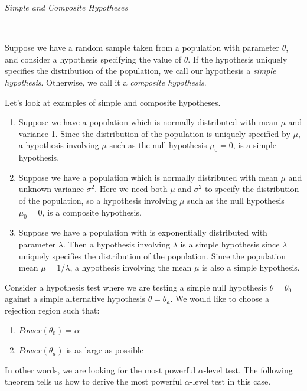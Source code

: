 \documentclass[notes.tex]{subfiles}
\begin{document}
\begin{framed}
\emph{Simple and Composite Hypotheses}\\
  \rule{\dimexpr{}\fboxrule}{.1pt} \\
Suppose we have a random sample taken from a population with parameter $\theta$, and consider a hypothesis specifying the value of $\theta$. If the hypothesis uniquely specifies the distribution of the population, we call our hypothesis a \emph{simple hypothesis}. Otherwise, we call it a \emph{composite hypothesis}.
\end{framed}
Let's look at examples of simple and composite hypotheses.
\begin{example}
\begin{enumerate}\leavevmode 
\item Suppose we have a population which is normally distributed with mean $\mu$ and variance 1. Since the distribution of the population is uniquely specified by $\mu$, a hypothesis involving $\mu$ such as the null hypothesis $\mu_0 = 0$, is a simple hypothesis.
\item Suppose we have a population which is normally distributed with mean $\mu$ and unknown variance $\sigma^2$. Here we need both $\mu$ and $\sigma^2$ to specify the distribution of the population, so a hypothesis involving $\mu$ such as the null hypothesis $\mu_0 = 0$, is a composite hypothesis.
\item Suppose we have a population with is exponentially distributed with parameter $\lambda$. Then a hypothesis involving $\lambda$ is a simple hypothesis since $\lambda$ uniquely specifies the distribution of the population. Since the population mean $\mu = 1 / \lambda$, a hypothesis involving the mean $\mu$ is also a simple hypothesis.
\end{enumerate}
\end{example}
Consider a hypothesis test where we are testing a simple null hypothesis $\theta = \theta_0$ against a simple alternative hypothesis $\theta = \theta_a$. We would like to choose a rejection region such that:
\begin{enumerate}
\item $Power(\theta_0) = \alpha$
\item $Power(\theta_a)$ is as large as possible
\end{enumerate}
In other words, we are looking for the most powerful $\alpha$-level test. The following theorem tells us how to derive the most powerful $\alpha$-level test in this case.
\end{document}
